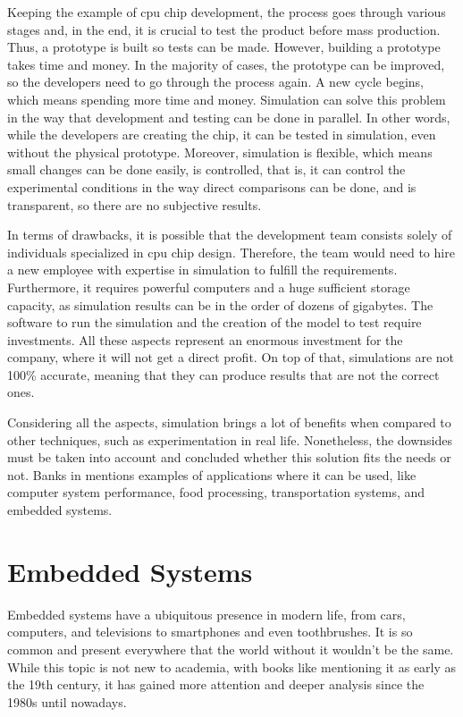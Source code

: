 Keeping the example of \gls{cpu} chip development, the process goes through various stages and, in the end, it is crucial to test the product 
before mass production. Thus, a prototype is built so tests can be made. However, building a prototype takes time and money. In the majority of 
cases, the prototype can be improved, so the developers need to go through the process again. A new cycle begins, which means spending more time 
and money. Simulation can solve this problem in the way that development and testing can be done in parallel. In other words, while the developers 
are creating the chip, it can be tested in simulation, even without the physical prototype. Moreover, simulation is flexible, which means small 
changes can be done easily, is controlled, that is, it can control the experimental conditions in the way direct comparisons can be done, 
and is transparent, so there are no subjective results.

In terms of drawbacks, it is possible that the development team consists solely of individuals specialized in \gls{cpu} chip design. Therefore, 
the team would need to hire a new employee with expertise in simulation to fulfill the requirements. Furthermore, it requires powerful computers 
and a huge sufficient storage capacity, as simulation results can be in the order of dozens of gigabytes. The software to run the simulation and 
the creation of the model to test require investments. All these aspects represent an enormous investment for the company, where it will not get 
a direct profit. On top of that, simulations are not 100\% accurate, meaning that they can produce results that are not the correct ones.

Considering all the aspects, simulation brings a lot of benefits when compared to other techniques, such as experimentation in real life. 
Nonetheless, the downsides must be taken into account and concluded whether this solution fits the needs or not. Banks in 
\cite{BanksDiscreteSimulation} mentions examples of applications where it can be used, like computer system performance, food processing, 
transportation systems, and embedded systems.


\section{Embedded Systems}

Embedded systems have a ubiquitous presence in modern life, from cars, computers, and televisions to smartphones and even toothbrushes. It is 
so common and present everywhere that the world without it wouldn't be the same. While this topic is not new to academia, with books like 
\cite{banks1999introduction} mentioning it as early as the 19th century, it has gained more attention and deeper analysis since the 1980s until 
nowadays. 

